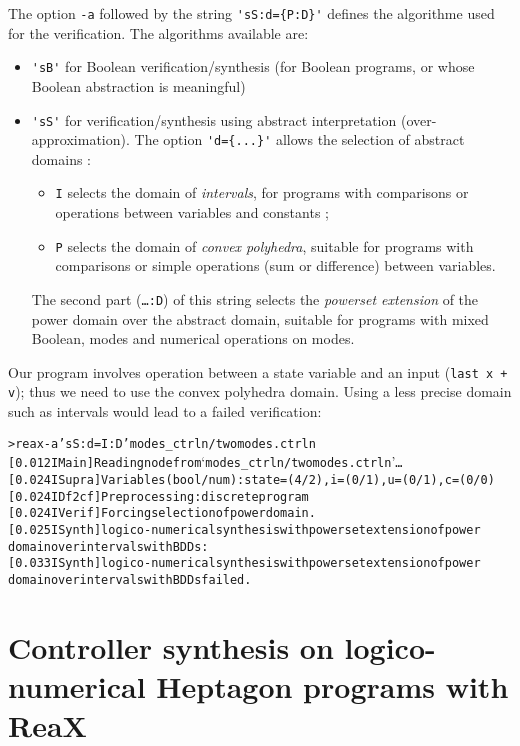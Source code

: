 \documentclass[a4paper]{article}
\begin{document}
The option \texttt{-a} followed by the string \verb+'sS:d={P:D}'+
defines the algorithme used for the verification. The algorithms
available are:
\begin{itemize}
\item \verb+'sB'+ for Boolean verification/synthesis (for Boolean
  programs, or whose Boolean abstraction is meaningful)
\item \verb+'sS'+ for verification/synthesis using abstract
  interpretation (over-approximation). The option \verb+'d={...}'+
  allows the selection of abstract domains :
  \begin{itemize}
  \item \texttt{I} selects the domain of \emph{intervals}, for
    programs with comparisons or operations between variables and
    constants ;
  \item \texttt{P} selects the domain of \emph{convex polyhedra},
    suitable for programs with comparisons or simple operations (sum or
    difference)
    between variables.
  \end{itemize}
  The second part (\texttt{\ldots:D}) of this string selects the
  \emph{powerset extension} of the power domain over the abstract
  domain, suitable for programs with mixed Boolean, modes and
  numerical operations on modes.
\end{itemize}

Our program involves operation between a state variable and an input
(\lstinline{last x + v}); thus we need to use the convex polyhedra
domain. Using a less precise domain such as intervals would lead to a
failed verification:
\begin{alltt}
\textcolor{deepgreen}{> reax -a 'sS:d={I:D}' modes_ctrln/twomodes.ctrln} 
[0.012 I Main] Reading node from `modes_ctrln/twomodes.ctrln'…
[0.024 I Supra] Variables(bool/num): state=(4/2), i=(0/1), u=(0/1), c=(0/0)
[0.024 I Df2cf] Preprocessing: discrete program
[0.024 I Verif] Forcing selection of power domain.
[0.025 I Synth] logico-numerical synthesis with powerset extension of power
                domain over intervals with BDDs:
[0.033 I Synth] {\color{red}logico-numerical synthesis with powerset extension of power
                domain over intervals with BDDs failed.}
\end{alltt}
              
\section{Controller synthesis on logico-numerical Heptagon programs with ReaX}
\end{document}
